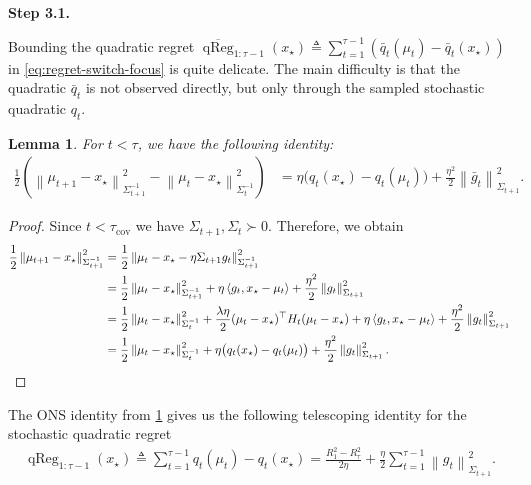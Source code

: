\documentclass{article}
\newtheorem{lemma}[lemma]{Lemma}
\newcommand{\proofstepinline}[1]{%
    {\normalfont\normalsize\bfseries\color{blue!55!black}Step #1.}\enspace
}
\newcommand{\1}{\mathbf 1}
\newcommand{\ip}[2]{\left\langle #1,#2\right\rangle}
\newcommand{\normm}[2]{\left\lVert #1\right\rVert_{#2}}
\begin{document}
\proofstepinline{3.1}
Bounding the quadratic regret $
    \overline{\operatorname{qReg}}_{1:\tau -1}(x_{\star})
    \triangleq
    \sum_{t=1}^{\tau -1}
    \left(\bar{q}_t(\mu_t)-\bar{q}_t(x_{\star})\right)
$ in \eqref{eq:regret-switch-focus} is quite delicate.
The main difficulty is that the quadratic $\bar{q}_t$ is not observed directly, but only through the sampled stochastic quadratic $q_t$.
\begin{lemma}
    \label{lem:ons-identity}
    For $t < \tau$, we have the following identity:
    \begin{align}
        \frac12
        \left(\normm{\mu_{t+1}-x_\star}{\Sigma_{t+1}^{-1}}^2
        -\normm{\mu_t-x_\star}{\Sigma_t^{-1}}^2
        \right)
         & =
        \eta\bigl(q_t(x_\star)-q_t(\mu_t)\bigr)
        +\frac{\eta^2}{2}\normm{\bar{g}_t}{\Sigma_{t+1}}^2.
    \end{align}
\end{lemma}
\begin{proof}
    Since $t < \tau_{\mathrm{cov}}$ we have $\Sigma_{t+1}, \Sigma_t \succ 0$.
    Therefore, we obtain
    \begin{align}
        \frac12\normm{\mu_{t+1}-x_\star}{\Sigma_{t+1}^{-1}}^2
         & =\frac12\normm{\mu_t-x_\star-\eta\Sigma_{t+1}g_t}
        {\Sigma_{t+1}^{-1}}^2                                 \\
         & =\frac12\normm{\mu_t-x_\star}{\Sigma_{t+1}^{-1}}^2
        +\eta\ip{g_t}{x_\star-\mu_t}
        +\frac{\eta^2}{2}\normm{g_t}{\Sigma_{t+1}}^2          \\
         & =\frac12\normm{\mu_t-x_\star}{\Sigma_t^{-1}}^2
        +\frac{\lambda\eta}{2}(\mu_t-x_\star)^\top H_t (\mu_t-x_\star)
        +\eta\ip{g_t}{x_\star-\mu_t}
        +\frac{\eta^2}{2}\normm{g_t}{\Sigma_{t+1}}^2          \\
         & =\frac12\normm{\mu_t-x_\star}{\Sigma_t^{-1}}^2
        +\eta\bigl(q_t(x_\star)-q_t(\mu_t)\bigr)
        +\frac{\eta^2}{2}\normm{g_t}{\Sigma_{t+1}}^2.
        \qedhere
    \end{align}
\end{proof}
The ONS identity from \cref{lem:ons-identity} gives us
the following telescoping identity for the stochastic quadratic regret
\begin{align}
    \operatorname{qReg}_{1:\tau -1}(x_{\star})
    \triangleq
    \sum_{t=1}^{\tau-1}
    q_t(\mu_t)-q_t(x_\star)
    =
    \frac{R_1^2 - R_\tau^2}{2\eta }
    +\frac{\eta}{2}\sum_{t=1}^{\tau-1}\normm{g_t}{\Sigma_{t+1}}^2.
    \label{eq:ons-telescope}
\end{align}
\end{document}
